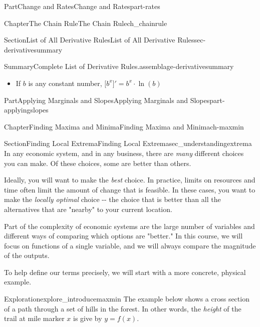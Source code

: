 \documentclass[oneside,10pt,]{tufte-book}
\numberwithin{equation}{chapter}
\newcommand{\D}[1]{ \Big[ #1 \Big]'  }
\begin{document}
\begin{partptx}{Part}{Change and Rates}{}{Change and Rates}{}{}{part-rates}
\begin{chapterptx}{Chapter}{The Chain Rule}{}{The Chain Rule}{}{}{ch_chainrule}
\begin{sectionptx}{Section}{List of All Derivative Rules}{}{List of All Derivative Rules}{}{}{sec-derivativesummary}
\begin{assemblage}{Summary}{Complete List of Derivative Rules.}{assemblage-derivativesummary}
\begin{itemize}[label=\textbullet]
\begin{itemize}[label=$\circ$]
\end{itemize}
%
\item{}If \(b\) is any constant number, \(\D{ b^x } = b^x\cdot \ln(b)\)%
\end{itemize}
%
\end{assemblage}
\end{sectionptx}
\end{chapterptx}
\end{partptx}
%
%
\typeout{************************************************}
\typeout{************************************************}
%
\begin{partptx}{Part}{Applying Marginals and Slopes}{}{Applying Marginals and Slopes}{}{}{part-applyingslopes}
\renewcommand*{\partname}{Part}
%
\typeout{************************************************}
\typeout{************************************************}
%
\begin{chapterptx}{Chapter}{Finding Maxima and Minima}{}{Finding Maxima and Minima}{}{}{ch-maxmin}
\renewcommand*{\chaptername}{Chapter}
%
%
\typeout{************************************************}
\typeout{************************************************}
%
\begin{sectionptx}{Section}{Finding Local Extrema}{}{Finding Local Extrema}{}{}{sec_understandingextrema}
In any economic system, and in any business, there are \emph{many} different choices you can make. Of these choices, some are better than others.%
\par
Ideally, you will want to make the \emph{best} choice. In practice, limits on resources and time often limit the amount of change that is feasible. In these cases, you want to make the \emph{locally optimal} choice -{}-{} the choice that is better than all the alternatives that are "nearby" to your current location.%
\par
Part of the complexity of economic systems are the  large number of variables and different ways of comparing which options are "better." In this course, we will focus on functions of a single variable, and we will always compare the magnitude of the outputs.%
\par
To help define our terms precisely, we will start with a more concrete, physical example.%
\begin{exploration}{Exploration}{}{explore_introducemaxmin}%
The example below shows a cross section of a path through a set of hills in the forest. In other words, the \emph{height} of the trail at mile marker \(x\) is give by \(y=f(x)\).%

\end{exploration}
\end{sectionptx}
\end{chapterptx}
\end{partptx}
\end{document}
